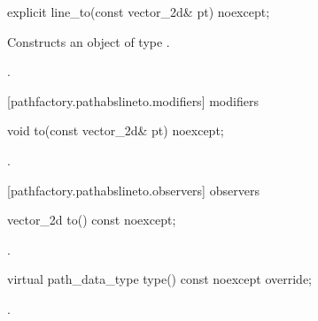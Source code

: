 \begin{itemdecl}
    explicit line_to(const vector_2d& pt) noexcept;
\end{itemdecl}
\begin{itemdescr}
	\pnum
	\effects
	Constructs an object of type .
	
	\pnum
	\postconditions
	.
\end{itemdescr}

 [pathfactory.pathabslineto.modifiers]{ modifiers}

\begin{itemdecl}
    void to(const vector_2d& pt) noexcept;
\end{itemdecl}
\begin{itemdescr}
	\pnum
	\postconditions
	.
\end{itemdescr}

 [pathfactory.pathabslineto.observers]{ observers}

\begin{itemdecl}
    vector_2d to() const noexcept;
\end{itemdecl}
\begin{itemdescr}
	\pnum
	\returns
	.
\end{itemdescr}

\begin{itemdecl}
    virtual path_data_type type() const noexcept override;
\end{itemdecl}
\begin{itemdescr}
	\pnum
	\returns
	.
\end{itemdescr}
